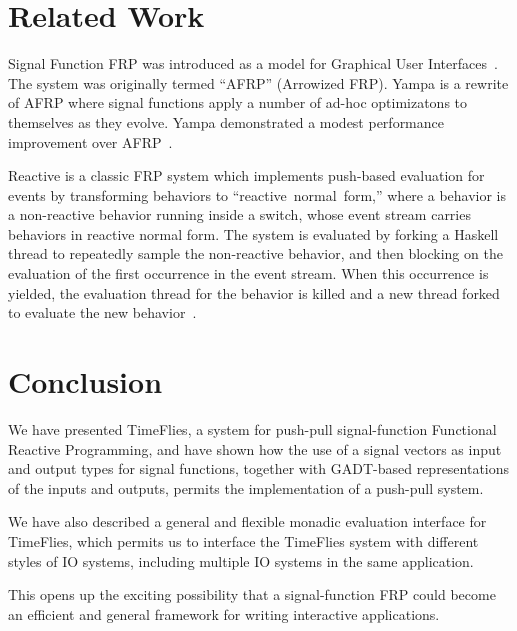 \documentclass[draft]{llncs}
\begin{document}
\section{Related Work}
\label{section:Related_Work}

Signal Function FRP was introduced as a model for Graphical User Interfaces~\cite{Courtney2001-1}.
The system was originally termed ``AFRP'' (Arrowized FRP). Yampa is a rewrite of
AFRP where signal functions apply a number of ad-hoc optimizatons to themselves
as they evolve. Yampa demonstrated a modest performance improvement
over AFRP~\cite{Nilsson2005}.

Reactive is a classic FRP system which implements push-based evaluation for events
by transforming behaviors to ``reactive~normal~form,'' where a behavior
is a non-reactive behavior running inside a switch, whose event stream carries
behaviors in reactive normal form. The system is evaluated by forking a Haskell
thread to repeatedly sample the non-reactive behavior, and then blocking on the
evaluation of the first occurrence in the event stream. When this occurrence
is yielded, the evaluation thread for the behavior is killed and a new
thread forked to evaluate the new behavior~\cite{Elliott2009}. 

\section{Conclusion}
\label{section:Conclusion}

We have presented TimeFlies, a system for push-pull signal-function Functional
Reactive Programming, and have shown how the use of a signal vectors as input
and output types for signal functions, together with GADT-based representations
of the inputs and outputs, permits the implementation of a push-pull system.

We have also described a general and flexible monadic evaluation interface for
TimeFlies, which permits us to interface the TimeFlies system with different
styles of IO systems, including multiple IO systems in the same application.

This opens up the exciting possibility that a signal-function FRP could become
an efficient and general framework for writing interactive applications.



\end{document}
